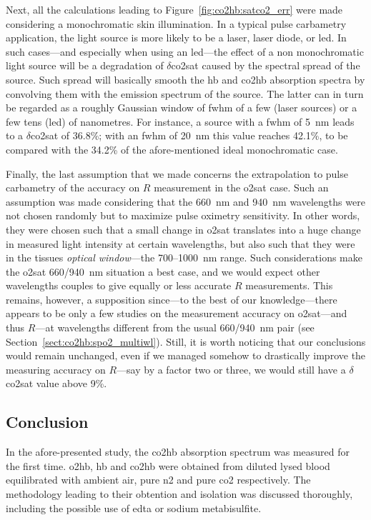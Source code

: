 Next, all the calculations leading to Figure~\ref{fig:co2hb:satco2_err} were made considering a monochromatic skin illumination. In a typical pulse carbametry application, the light source is more likely to be a laser, laser diode, or \gls{led}. In such cases---and especially when using an \gls{led}---the effect of a non monochromatic light source will be a degradation of $\delta$\gls{co2sat} caused by the spectral spread of the source. Such spread will basically smooth the \gls{hb} and \gls{co2hb} absorption spectra by convolving them with the emission spectrum of the source. The latter can in turn be regarded as a roughly Gaussian window of \gls{fwhm} of a few (laser sources) or a few tens (\gls{led}) of nanometres. For instance, a source with a \gls{fwhm} of 5~nm leads to a $\delta$\gls{co2sat} of 36.8\%; with an \gls{fwhm} of 20~nm this value reaches 42.1\%, to be compared with the 34.2\% of the afore-mentioned ideal monochromatic case.

Finally, the last assumption that we made concerns the extrapolation to pulse carbametry of the accuracy on $R$ measurement in the \gls{o2sat} case. Such an assumption was made considering that the 660~nm and 940~nm wavelengths were not chosen randomly but to maximize pulse oximetry sensitivity. In other words, they were chosen such that a small change in \gls{o2sat} translates into a huge change in measured light intensity at certain wavelengths\cite{mook1969, assendelft1970}, but also such that they were in the tissues \emph{optical window}---the 700--1000~nm range\cite{wilson1985, melo2001, ash2017}. Such considerations make the \gls{o2sat} 660/940~nm situation a best case, and we would expect other wavelengths couples to give equally or less accurate $R$ measurements. This remains, however, a supposition since---to the best of our knowledge---there appears to be only a few studies on the measurement accuracy on \gls{o2sat}---and thus $R$---at wavelengths different from the usual 660/940~nm pair (see Section~\ref{sect:co2hb:spo2_multiwl}). Still, it is worth noticing that our conclusions would remain unchanged, even if we managed somehow to drastically improve the measuring accuracy on $R$---say by a factor two or three, we would still have a $\delta$\gls{co2sat} value above 9\%.

\subsection{Conclusion}

In the afore-presented study, the \gls{co2hb} absorption spectrum was measured for the first time. \gls{o2hb}, \gls{hb} and \gls{co2hb} were obtained from diluted lysed blood equilibrated with ambient air, pure \gls{n2} and pure \gls{co2} respectively. The methodology leading to their obtention and isolation was discussed thoroughly, including the possible use of \gls{edta} or sodium metabisulfite.


